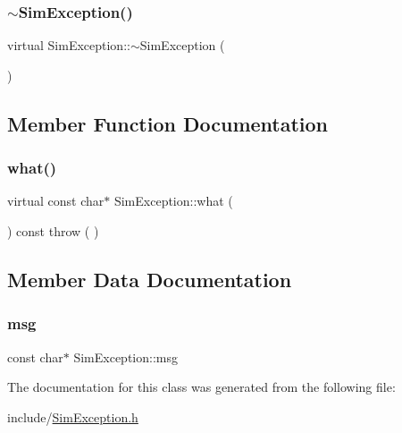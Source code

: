 \subsubsection{\texorpdfstring{$\sim$SimException()}{~SimException()}}
{\footnotesize\ttfamily virtual Sim\+Exception\+::$\sim$\+Sim\+Exception (\begin{DoxyParamCaption}{ }\end{DoxyParamCaption})\hspace{0.3cm}{\ttfamily [virtual]}}



\subsection{Member Function Documentation}
\mbox{\label{class_sim_exception_a7b759030340d1299a2eeb40c6f67a926}} 
\subsubsection{\texorpdfstring{what()}{what()}}
{\footnotesize\ttfamily virtual const char$\ast$ Sim\+Exception\+::what (\begin{DoxyParamCaption}{ }\end{DoxyParamCaption}) const throw ( ) \hspace{0.3cm}{\ttfamily [virtual]}}



\subsection{Member Data Documentation}
\mbox{\label{class_sim_exception_a1b07ee928b1ece4a807801a14713148a}} 
\subsubsection{\texorpdfstring{msg}{msg}}
{\footnotesize\ttfamily const char$\ast$ Sim\+Exception\+::msg\hspace{0.3cm}{\ttfamily [private]}}



The documentation for this class was generated from the following file\+:\begin{DoxyCompactItemize}
\item 
include/\mbox{\hyperlink{_sim_exception_8h}{Sim\+Exception.\+h}}\end{DoxyCompactItemize}
